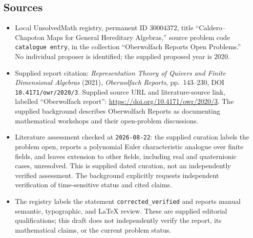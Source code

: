 \documentclass[11pt]{article}
\begin{document}
\subsection{Sources}
\begin{itemize}
\item Local UnsolvedMath registry, permanent ID \(30004372\), title ``Caldero--Chapoton Maps for General Hereditary Algebras,'' source problem code \texttt{catalogue entry}, in the collection ``Oberwolfach Reports Open Problems.'' No individual proposer is identified; the supplied proposed year is 2020.
\item Supplied report citation: \emph{Representation Theory of Quivers and Finite Dimensional Algebras} (2021), \emph{Oberwolfach Reports}, pp.~143--230, DOI \texttt{10.4171/owr/2020/3}. Supplied source URL and literature-source link, labelled ``Oberwolfach report'': \url{https://doi.org/10.4171/owr/2020/3}. The supplied background describes Oberwolfach Reports as documenting mathematical workshops and their open-problem discussions.
\item Literature assessment checked at \texttt{2026-08-22}: the supplied curation labels the problem open, reports a polynomial Euler characteristic analogue over finite fields, and leaves extension to other fields, including real and quaternionic cases, unresolved. This is supplied dated curation, not an independently verified assessment. The background explicitly requests independent verification of time-sensitive status and cited claims.
\item The registry labels the statement \texttt{corrected\_verified} and reports manual semantic, typographic, and LaTeX review. These are supplied editorial qualifications; this draft does not independently verify the report, its mathematical claims, or the current problem status.
\end{itemize}
\end{document}
